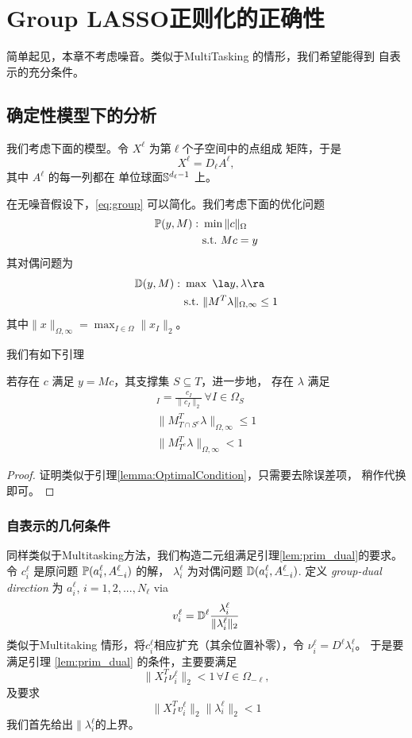 \documentclass[main.tex]{subfiles}
\begin{document}
\chapter{Group LASSO正则化的正确性}\label{chp:proof_group}
简单起见，本章不考虑噪音。类似于MultiTasking 的情形，我们希望能得到
自表示的充分条件。

\section{确定性模型下的分析}
我们考虑下面的模型。令 $X^\ell$ 为第$\ell$个子空间中的点组成
矩阵，于是
$$ X^\ell = D_\ell A^{\ell} ,$$ 
其中 $A^\ell$ 的每一列都在 单位球面$\S^{d_\ell-1}$ 上。

在无噪音假设下，\ref{eq:group} 可以简化。我们考虑下面的优化问题
\begin{align}
  \P(y,M): \,\, & \min \| c\|_{\Omega} \\
                & \mbox{s.t.}\,\, Mc = y
  \label{eq:group_primal}
\end{align}
其对偶问题为 
\begin{align}
  \D(y,M): \,\, &\max \,\, \la y, \lambda\ra \\
                & \mbox{s.t.}\,\, \|M^T\lambda\|_{\Omega,\infty} \leq 1
\end{align}
其中$\|x\|_{\Omega, \infty} = \max_{I \in \Omega} \|x_I\|_2$。

我们有如下引理 
\begin{lemma}
  \label{lem:prim_dual}
  若存在 $c$ 满足 $y = Mc$，其支撑集 $S \subseteq T$，进一步地，
  存在 $\lambda$ 满足
  \begin{align*}
    [M_{S}^T \lambda]_I = \frac{c_I}{\|c_I\|_2} \, \forall I \in \Omega_S\\
    \|M_{T\cap S^c}^T \lambda\|_{\Omega,\infty} \leq 1 \\
    \|M_{T^c}^T \lambda\|_{\Omega,\infty} < 1
  \end{align*}
\end{lemma}
\begin{proof}
  证明类似于引理\ref{lemma:OptimalCondition}，只需要去除误差项，
  稍作代换即可。
\end{proof}

\subsection{自表示的几何条件}
同样类似于Multitasking方法，我们构造二元组满足引理\ref{lem:prim_dual}的要求。
令 $c_{i}^{\ell}$ 是原问题 $\P(a_i^{\ell}, A_{-i}^{\ell})$ 的解，
$\lambda_i^{\ell}$ 为对偶问题 $\D(a_{i}^{\ell}, A_{-i}^{\ell})$.
定义 \emph{group-dual direction} 为 $a_{i}^{\ell}$, $i = 1,2,...,N_\ell$ via 
$$ v_i^\ell = \D^{\ell} \frac{\lambda_i^\ell}{\|\lambda_i^\ell \|_2} $$
类似于Multitaking 情形，将$c_i^{\ell}$相应扩充（其余位置补零），令 $\nu_i^\ell
= D^{\ell} \lambda_i^\ell$。 于是要满足引理 \ref{lem:prim_dual}
的条件，主要要满足 
$$ \| X^T_I \nu_i^\ell\|_2 < 1 \, \forall I \in \Omega_{-\ell},$$
及要求
$$\| X^T_I v_i^\ell\|_2 \|\lambda_i^\ell\|_2 < 1$$
我们首先给出$\|\lambda_i^\ell$的上界。
\end{document}
